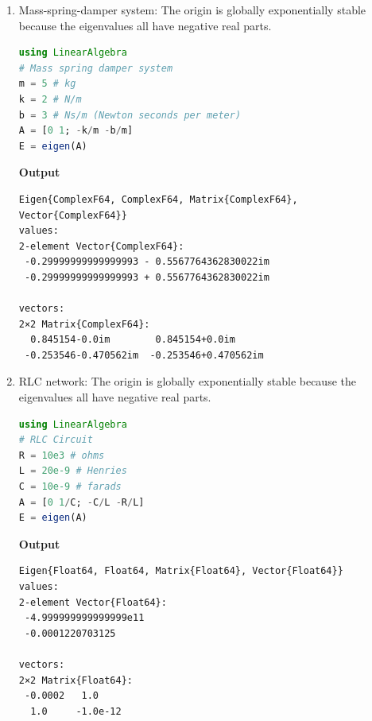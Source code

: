  \begin{enumerate}
\renewcommand{\labelenumi}{(\alph{enumi})}
\setlength{\itemsep}{.2cm}

\item Mass-spring-damper system: \Ans \quad  The origin is globally exponentially stable because the eigenvalues all have negative real parts. 

\begin{lstlisting}[language=Julia,style=mystyle]
using LinearAlgebra
# Mass spring damper system
m = 5 # kg
k = 2 # N/m
b = 3 # Ns/m (Newton seconds per meter)
A = [0 1; -k/m -b/m]
E = eigen(A)
\end{lstlisting}
\textbf{Output} 
\begin{verbatim}
Eigen{ComplexF64, ComplexF64, Matrix{ComplexF64}, Vector{ComplexF64}}
values:
2-element Vector{ComplexF64}:
 -0.29999999999999993 - 0.5567764362830022im
 -0.29999999999999993 + 0.5567764362830022im
 
vectors:
2×2 Matrix{ComplexF64}:
  0.845154-0.0im        0.845154+0.0im
 -0.253546-0.470562im  -0.253546+0.470562im
\end{verbatim}



\item RLC network:  \Ans \quad  The origin is globally exponentially stable because the eigenvalues all have negative real parts. 

\begin{lstlisting}[language=Julia,style=mystyle]
using LinearAlgebra
# RLC Circuit
R = 10e3 # ohms
L = 20e-9 # Henries
C = 10e-9 # farads
A = [0 1/C; -C/L -R/L]
E = eigen(A)
\end{lstlisting}
\textbf{Output} 
\begin{verbatim}
Eigen{Float64, Float64, Matrix{Float64}, Vector{Float64}}
values:
2-element Vector{Float64}:
 -4.999999999999999e11
 -0.0001220703125
 
vectors:
2×2 Matrix{Float64}:
 -0.0002   1.0
  1.0     -1.0e-12
\end{verbatim}
\end{enumerate}

\Qed

